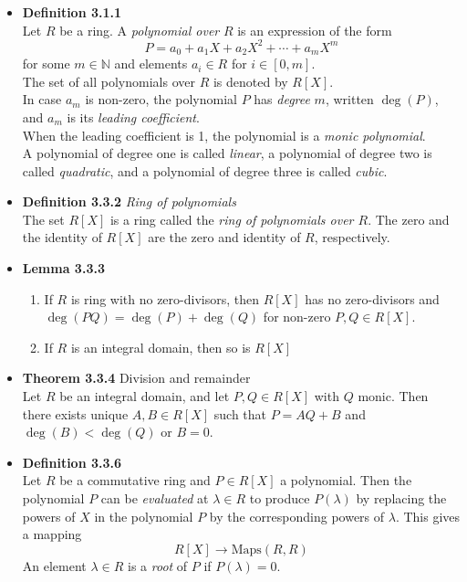 \documentclass[11pt,a4paper]{article}
\begin{document}
\begin{itemize}

    \item \textbf{Definition 3.1.1} \\
        Let $R$ be a ring.
        A \emph{polynomial over} $R$ is an expression of the form
        \[
            P = a_0 + a_1X + a_2{X^2} + \cdots + a_m{X^m}
        \]
        for some $m \in \mathbb{N}$ and elements $a_i \in R$ for $i \in [0,m]$.\\
        The set of all polynomials over $R$ is denoted by $R[X]$.\\
        In case $a_m$ is non-zero, the polynomial $P$ has \emph{degree} $m$, written
        $\deg(P)$, and $a_m$ is its \emph{leading coefficient}. \\
        When the leading coefficient is 1, the polynomial is a \emph{monic polynomial}.\\
        A polynomial of degree one is called \emph{linear},
        a polynomial of degree two is called \emph{quadratic},
        and a polynomial of degree three is called \emph{cubic}.

    \item \textbf{Definition 3.3.2} \emph{Ring of polynomials} \\
        The set $R[X]$ is a ring called the \emph{ring of polynomials over $R$}.
        The zero and the identity of $R[X]$ are the zero and identity of $R$, respectively.

    \item \textbf{Lemma 3.3.3}
        \begin{enumerate}
            \item If $R$ is ring with no zero-divisors, then $R[X]$ has no zero-divisors and
                $\deg(PQ) = \deg(P) + \deg(Q)$ for non-zero $P,Q \in R[X]$.
            \item If $R$ is an integral domain, then so is $R{[X]}$
        \end{enumerate}

    \item \textbf{Theorem 3.3.4} Division and remainder \\
        Let $R$ be an integral domain, and let $P,Q \in R[X]$ with $Q$ monic.
        Then there exists unique $A,B \in R{[X]}$ such that
        $P=AQ + B$ and $\deg(B) < \deg(Q)$ or $B=0$.

    \item \textbf{Definition 3.3.6} \\
        Let $R$ be a commutative ring and $P \in R[X]$ a polynomial.
        Then the polynomial $P$ can be \emph{evaluated} at $\lambda \in R$ to produce
        $P(\lambda)$
        by replacing the powers of $X$ in the polynomial $P$ by the corresponding powers of
        $\lambda$.
        This gives a mapping
        \[
            R[X] \to \mathrm{Maps}(R,R)
        \]
        An element $\lambda \in R$ is a \emph{root} of $P$ if $P(\lambda) = 0$.


\end{itemize}
\end{document}

